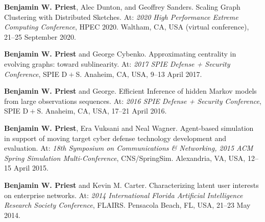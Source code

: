 \item \textbf{Benjamin W. Priest}, Alec Dunton, and Geoffrey Sanders.
        Scaling Graph Clustering with Distributed Sketches.
        At: \emph{2020 High Performance Extreme Computing Conference},
        HPEC 2020.
	Waltham, CA, USA (virtual conference),
        21--25 September 2020.

\item \textbf{Benjamin W. Priest} and George Cybenko.
	Approximating centrality in evolving graphs: toward sublinearity.
	At: \emph{2017 SPIE Defense + Security Conference}, 
	SPIE D$\! + \!$S. 
	Anaheim, CA, USA,
        9--13 April 2017.

\item \textbf{Benjamin W. Priest} and George.
	Efficient Inference of hidden Markov models from large observations sequences.
	At: \emph{2016 SPIE Defense + Security Conference}, 
	SPIE D$\! + \!$S. 
	Anaheim, CA, USA,
        17--21 April 2016.

\item \textbf{Benjamin W. Priest}, Era Vuksani and Neal Wagner.
	Agent-based simulation in support of moving target cyber defense technology development and evaluation.
	At: \emph{18th Symposium on Communications \& Networking, 2015 ACM Spring Simulation Multi-Conference}, 
	CNS/SpringSim. 
	Alexandria, VA, USA,
        12--15 April 2015.

\item \textbf{Benjamin W. Priest} and Kevin M. Carter.
	Characterizing latent user interests on enterprise networks.
	At: \emph{2014 International Florida Artificial Intelligence Research Society Conference},
	FLAIRS.
	Pensacola Beach, FL, USA,
	21--23 May 2014.
